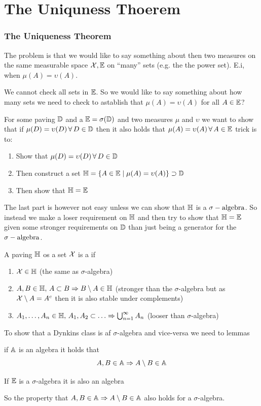 \section[Lecture 2]{The Uniquness  Thoerem} %
\label{sec:lecture_2}

\subsubsection*{The Uniqueness Theorem} %
\label{ssub:the_uniqueness_theorem}
The problem is that we would like to say something about then two measures on the same measurable space \({\mathcal{X}},{\mathbb{E}}\) on ``many'' sets (e.g. the the power set). E.i, when \(\mu(A)=\upsilon(A)\).

We cannot check all sets in \({\mathbb{E}}\). So we would like to say something about how many sets we need to check to astablish that \(\mu(A)=\upsilon(A)\) for all \(A\in{\mathbb{E}}\)?

For some paving \({\mathbb{D}}\) and a \({\mathbb{E}}=\sigma({\mathbb{D}})\) and two measures \(\mu\) and \(\upsilon\) we want to show that if \(\mu(D)=\upsilon(D)\, \forall \, D\in {\mathbb{D}}\) then it also holds that \(\mu(A)=\upsilon(A)\, \forall \, A\in {\mathbb{E}}\) trick is to:
\begin{enumerate}
  \item Show that \(\mu(D)=\upsilon(D)\, \forall \, D\in{\mathbb{D}}\)
  \item Then construct a set \({\mathbb{H}}=\{A\in{\mathbb{E}}\mid \mu(A)=\upsilon(A)\}\supset{\mathbb{D}}\)
  \item Then show that \({\mathbb{H}}={\mathbb{E}}\)
\end{enumerate}

The last part is however not easy unless we can show that \({\mathbb{H}}\) is a \(\sigma-\text{algebra}\). So instead we make a loser requirement on \({\mathbb{H}}\) and then try to show that \({\mathbb{H}}={\mathbb{E}}\) given some stronger requirements on \({\mathbb{D}}\) than just being a generator for the \(\sigma-\text{algebra}\).
\begin{defn}
A paving \({\mathbb{H}}\) os a set \({\mathcal{X}}\) is a  if
\begin{enumerate}
  \item \({\mathcal{X}}\in{\mathbb{H}}\) (the same as \(\sigma\)-algebra)
  \item \(A,B\in{\mathbb{H}},\, A\subset B \Rightarrow B\setminus A\in {\mathbb{H}}\) (stronger than the \(\sigma\)-algebra but as \({\mathcal{X}}\setminus A=A^c\) then it is also stable under complements)
  \item \(A_1,\ldots,A_n\in{\mathbb{H}},\, A_1, A_2 \subset \ldots \Rightarrow \bigcup_{n=1}^\infty A_n\) (looser than \(\sigma\)-algebra)
\end{enumerate}
\end{defn}
To show that a Dynkins class is af \(\sigma\)-algebra and vice-versa we need to lemmas
\begin{lem}
if \({\mathbb{A}}\) is an algebra it holds that
\[
  A,B\in{\mathbb{A}} \Rightarrow A\setminus B\in {\mathbb{A}}
\]
\end{lem}
\begin{lem}
If \({\mathbb{E}}\) is a \(\sigma\)-algebra it is also an algebra
\end{lem}
So the property that \(A,B\in{\mathbb{A}} \Rightarrow A\setminus B\in {\mathbb{A}} \) also holds for a \(\sigma\)-algebra.


